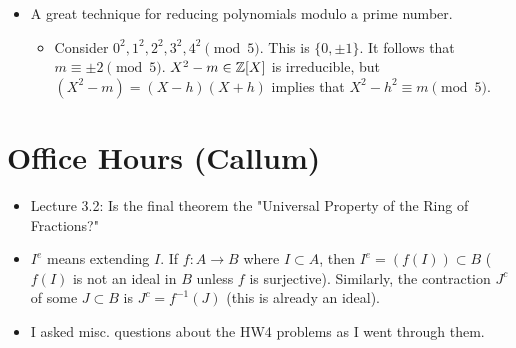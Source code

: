 \documentclass[../notes.tex]{subfiles}
\begin{document}
\begin{itemize}
\begin{proof}
        We have $g=b_0X^d+b_1X^{d-1}+\cdots+b_d$ ($b_i\in\Z$). Thus, $g/b_0=(X-z_1)\cdots(X-z_d)$ with $f(z_1)=\cdots=f(z_d)=0$. Then we have the following by expanding.
        \begin{equation*}
            = X^d-\left( \sum_{i=1}^dz_i \right)X^{d-1}+\left( \sum_{1\leq i\leq j\leq d}z_iz_j \right)X^{d-2}+\cdots
        \end{equation*}
        The second term is equal to $b_1/b_0$; the third is $b_2/b_0$; etc.
        We thus have an upper bound
        \begin{equation*}
            |b_r/b_0| \leq (2C)^r\binom{d}{r}
        \end{equation*}
        Note that $\ell(g)\mid\ell(f)$. The search for the coefficients is now limited to a finite space, and we are done. $a_0b_r/b_0\in\Z$ and we have an upper bound on its absolute value, specifically the following which, at this point, we can turn over the problem to someone with a computer to solve.
        \begin{equation*}
            |a_0b_r/b_0| \leq (2C)^r\binom{d}{r}(a_0)
        \end{equation*}
    \end{proof}
    \item A great technique for reducing polynomials modulo a prime number.
    \begin{itemize}
        \item Consider $0^2,1^2,2^2,3^2,4^2\pmod 5$. This is $\{0,\pm 1\}$. It follows that $m\equiv\pm 2\pmod 5$. $X^2-m\in\mathbb{Z}[X]$ is irreducible, but $(X^2-m)=(X-h)(X+h)$ implies that $X^2-h^2\equiv m\pmod 5$.
    \end{itemize}
\end{itemize}



\section{Office Hours (Callum)}
\begin{itemize}
    \item Lecture 3.2: Is the final theorem the "Universal Property of the Ring of Fractions?"
    \item $I^e$ means extending $I$. If $f:A\to B$ where $I\subset A$, then $I^e=(f(I))\subset B$ ($f(I)$ is not an ideal in $B$ unless $f$ is surjective). Similarly, the contraction $J^c$ of some $J\subset B$ is $J^c=f^{-1}(J)$ (this is already an ideal).
    \item I asked misc. questions about the HW4 problems as I went through them.
\end{itemize}
\end{document}
